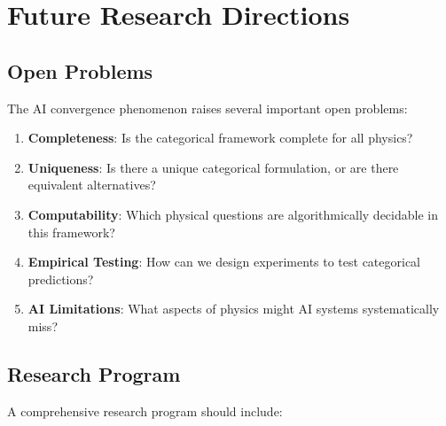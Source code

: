\documentclass[11pt,a4paper]{article}
\begin{document}
\section{Future Research Directions}

\subsection{Open Problems}

The AI convergence phenomenon raises several important open problems:

\begin{enumerate}
    \item \textbf{Completeness}: Is the categorical framework complete for all physics?
    \item \textbf{Uniqueness}: Is there a unique categorical formulation, or are there equivalent alternatives?
    \item \textbf{Computability}: Which physical questions are algorithmically decidable in this framework?
    \item \textbf{Empirical Testing}: How can we design experiments to test categorical predictions?
    \item \textbf{AI Limitations}: What aspects of physics might AI systems systematically miss?
\end{enumerate}

\subsection{Research Program}

A comprehensive research program should include:
\end{document}
